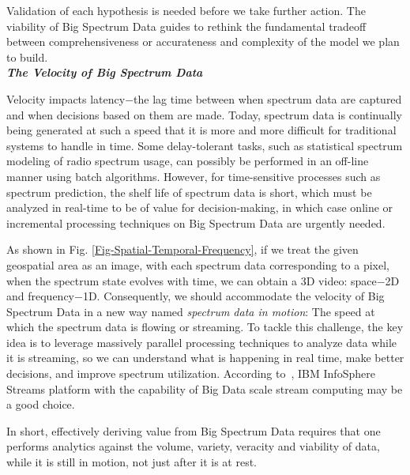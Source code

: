 \documentclass[12pt,draftcls,journal,letterpaper,oneside,onecolumn]{IEEEtran}
\begin{document}
Validation of each hypothesis is needed before we take further action. The viability of Big Spectrum Data guides to rethink the fundamental tradeoff between comprehensiveness or accurateness and complexity of the model we plan to build.
\\





\textbf{\emph{The Velocity of Big Spectrum Data}}

Velocity impacts latency$-$the lag time between when spectrum data are captured and when decisions based on them are made. Today, spectrum data is continually being generated at such a speed that it is more and more difficult for traditional systems to handle in time. Some delay-tolerant tasks, such as statistical spectrum modeling of radio spectrum usage, can possibly be performed in an off-line manner using batch algorithms. However, for time-sensitive processes such as spectrum prediction, the shelf life of spectrum data is short, which must be analyzed in real-time to be of value for decision-making, in which case online or incremental processing techniques on Big Spectrum Data are urgently needed.

As shown in Fig. \ref{Fig-Spatial-Temporal-Frequency}, if we treat the given geospatial area as an image, with each spectrum data corresponding to a pixel, when the spectrum state evolves with time, we can obtain a 3D video: space$-$2D and frequency$-$1D. Consequently, we should accommodate the velocity of Big Spectrum Data in a new way named \emph{spectrum data in motion}: The speed at which the spectrum data is flowing or streaming. To tackle this challenge, the key idea is to leverage massively parallel processing techniques to analyze data while it is streaming, so we can understand what is happening in real time, make better decisions, and improve spectrum utilization. According to~\cite{Understanding-Big-Data}, IBM InfoSphere Streams platform with the capability of Big Data scale stream computing may be a good choice.







In short, effectively deriving value from Big Spectrum Data requires that one performs analytics against the volume, variety, veracity and viability of data, while it is still in motion, not just after it is at rest.
\\
\end{document}
